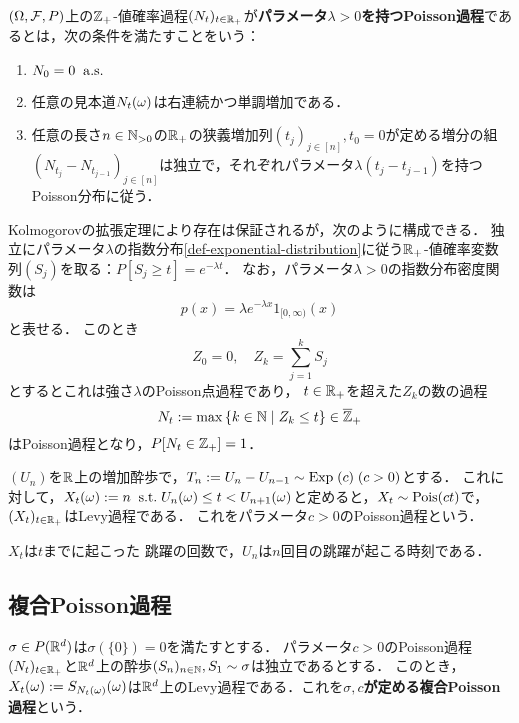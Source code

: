 \documentclass[uplatex,dvipdfmx]{jsreport}
\begin{document}
\begin{definition}
    $(\Omega,\mathcal{F},P)$上の$\mathbb{Z}_+$-値確率過程$(N_t)_{t\in\mathbb{R}_+}$が\textbf{パラメータ$\lambda>0$を持つPoisson過程}であるとは，次の条件を満たすことをいう：
    \begin{enumerate}
        \item $N_0=0\;\;\mathrm{a.s.}$
        \item 任意の見本道$N_t(\omega)$は右連続かつ単調増加である．
        \item 任意の長さ$n\in\mathbb{N}_{>0}$の$\mathbb{R}_+$の狭義増加列$(t_j)_{j\in[n]},t_0=0$が定める増分の組$(N_{t_j}-N_{t_{j-1}})_{j\in[n]}$は独立で，それぞれパラメータ$\lambda(t_j-t_{j-1})$を持つPoisson分布に従う．
    \end{enumerate}
\end{definition}

\begin{discussion}[Poisson過程の構成]
    Kolmogorovの拡張定理により存在は保証されるが，次のように構成できる．
    独立にパラメータ$\lambda$の指数分布\ref{def-exponential-distribution}に従う$\mathbb{R}_+$-値確率変数列$(S_j)$を取る：$P[S_j\ge t]=e^{-\lambda t}$．
    なお，パラメータ$\lambda>0$の指数分布密度関数は
    \[p(x)=\lambda e^{-\lambda x}1_{[0,\infty)}(x)\]
    と表せる．
    このとき
    \[Z_0=0,\quad Z_k=\sum^k_{j=1}S_j\]
    とするとこれは強さ$\lambda$のPoisson点過程であり，
    $t\in\mathbb{R}_+$を超えた$Z_k$の数の過程
    \[N_t:=\max\left\{k\in\mathbb{N}\mid Z_k\le t\right\}\in\overline{\mathbb{Z}}_+\]
    はPoisson過程となり，$P[N_t\in\mathbb{Z}_+]=1$．
\end{discussion}

\begin{theorem}
    $(U_n)$を$\mathbb{R}$上の増加酔歩で，$T_n:=U_n-U_{n-1}\sim\mathrm{Exp}\;(c)\;(c>0)$とする．
    これに対して，$X_t(\omega):=n\;\;\mathrm{s.t.}\; U_n(\omega)\le t<U_{n+1}(\omega)$と定めると，$X_t\sim\mathrm{Pois}(ct)$で，$(X_t)_{t\in\mathbb{R}_+}$はLevy過程である．
    これをパラメータ$c>0$のPoisson過程という．
\end{theorem}
\begin{remarks}
    $X_t$は$t$までに起こった
    跳躍の回数で，$U_n$は$n$回目の跳躍が起こる時刻である．
\end{remarks}

\subsection{複合Poisson過程}

\begin{theorem}
    $\sigma\in P(\mathbb{R}^d)$は$\sigma(\{0\})=0$を満たすとする．
    パラメータ$c>0$のPoisson過程$(N_t)_{t\in\mathbb{R}_+}$と$\mathbb{R}^d$上の酔歩$(S_n)_{n\in\mathbb{N}},S_1\sim\sigma$は独立であるとする．
    このとき，$X_t(\omega):=S_{N_t(\omega)}(\omega)$は$\mathbb{R}^d$上のLevy過程である．これを\textbf{$\sigma,c$が定める複合Poisson過程}という．
\end{theorem}
\end{document}
